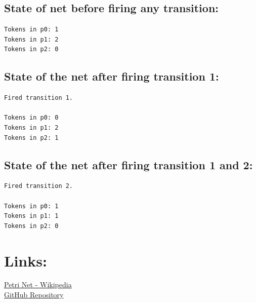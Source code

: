 \documentclass[a4paper, 12pt]{article}
\begin{document}
\subsection*{State of net before firing any transition:}
\begin{lstlisting}
Tokens in p0: 1
Tokens in p1: 2
Tokens in p2: 0
\end{lstlisting}

\subsection*{State of the net after firing transition 1:}
\begin{lstlisting}
Fired transition 1.

Tokens in p0: 0
Tokens in p1: 2
Tokens in p2: 1
\end{lstlisting}

\subsection*{State of the net after firing transition 1 and 2:}
\begin{lstlisting}
Fired transition 2.

Tokens in p0: 1
Tokens in p1: 1
Tokens in p2: 0
\end{lstlisting}

\section*{Links:}
\href{https://en.wikipedia.org/wiki/Petri_net}{Petri Net - Wikipedia}\\
\href{https://github.com/metwadsprite/OOP-Homework-2}{GitHub Repository}
\end{document}
